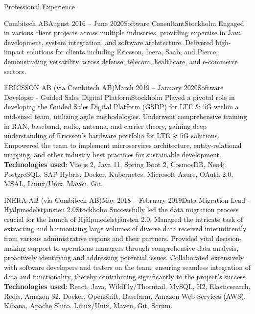 \documentclass{resume}
\begin{document}
\begin{rSection}{Professional Experience}
\begin{rSubsection}{Combitech AB}{August 2016 -- June 2020}{Software Consultant}{Stockholm}
\bItem Engaged in various client projects across multiple industries, providing expertise in Java development, system integration, and software architecture.
\bItem Delivered high-impact solutions for clients including Ericsson, Inera, Saab, and Pierce, demonstrating versatility across defense, telecom, healthcare, and e-commerce sectors.
\end{rSubsection}

\begin{rSubsection}{ERICSSON AB (via Combitech AB)}{March 2019 -- January 2020}{Software Developer - Guided Sales Digital Platform}{Stockholm}
\bItem Played a pivotal role in developing the Guided Sales Digital Platform (GSDP) for LTE \& 5G within a mid-sized team, utilizing agile methodologies.
\bItem Underwent comprehensive training in RAN, baseband, radio, antenna, and carrier theory, gaining deep understanding of Ericsson's hardware portfolio for LTE \& 5G solutions.
\bItem Empowered the team to implement microservices architecture, entity-relational mapping, and other industry best practices for sustainable development.
\bItem \textbf{Technologies used}: Vue.js 2, Java 11, Spring Boot 2, CosmosDB, Neo4j, PostgreSQL, SAP Hybris, Docker, Kubernetes, Microsoft Azure, OAuth 2.0, MSAL, Linux/Unix, Maven, Git.
\end{rSubsection}

\begin{rSubsection}{INERA AB (via Combitech AB)}{May 2018 -- February 2019}{Data Migration Lead - Hjälpmedelstjänsten 2.0}{Stockholm}
\bItem Successfully led the data migration process crucial for the launch of Hjälpmedelstjänsten 2.0.
\bItem Managed the intricate task of extracting and harmonizing large volumes of diverse data received intermittently from various administrative regions and their partners.
\bItem Provided vital decision-making support to operations managers through comprehensive data analysis, proactively identifying and addressing potential issues.
\bItem Collaborated extensively with software developers and testers on the team, ensuring seamless integration of data and functionality, thereby contributing significantly to the project's success.
\bItem \textbf{Technologies used}: React, Java, WildFly/Thorntail, MySQL, H2, Elasticsearch, Redis, Amazon S2, Docker, OpenShift, Basefarm, Amazon Web Services (AWS), Kibana, Apache Shiro, Linux/Unix, Maven, Git, Scrum.
\end{rSubsection}


\end{rSection}
\end{document}
